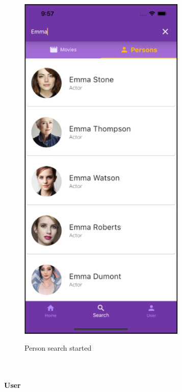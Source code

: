 \documentclass[12pt, a4paper]{article}
\numberwithin{figure}{section}
\begin{document}
\begin{center}
\begin{minipage}[t]{0.31\textwidth}
\begin{figure}[H]
			\includegraphics[width=0.71\textwidth]{images/final/searchEmma.png}\\
			\caption{Person search started}
		\end{figure}
	\end{minipage}
\end{center}

\mbox{}\\

\paragraph{User}
\end{document}
